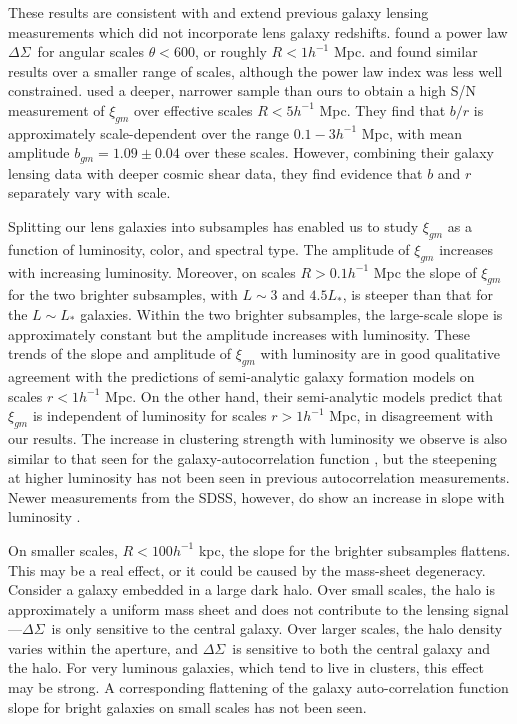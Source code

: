 \documentclass{emulateapj}
\newcommand{\deltasig}{$\Delta \Sigma$}
\begin{document}
These results are consistent with and extend previous galaxy 
lensing measurements which did not incorporate lens galaxy redshifts. 
\citet{fis00} found a power law \deltasig\ for angular
scales $\theta < 600$\arcsec, or roughly $R < 1 h^{-1}$ Mpc. 
\citet{Wilson01} and \citet{Hoekstra03a} found similar
results over a smaller range of scales, although the power law index was less
well constrained.  \citet{Hoekstra02b} used a deeper, narrower 
sample than ours to obtain a high S/N measurement of $\xi_{gm}$ over effective 
scales $R< 5 h^{-1}$ Mpc. 
They find that $b/r$ is approximately scale-dependent over 
the range $0.1-3 h^{-1}$ Mpc, with mean amplitude 
$b_{gm} = 1.09 \pm 0.04$ over these
scales. However, combining their galaxy lensing data with deeper 
cosmic shear data, they find evidence that $b$ and $r$ separately 
vary with scale.

Splitting our lens galaxies into subsamples has enabled us to 
study $\xi_{gm}$ as a function of luminosity, color, and spectral type. 
The amplitude of $\xi_{gm}$ increases 
with increasing luminosity. Moreover, on scales $R> 0.1 h^{-1}$ Mpc 
the slope of $\xi_{gm}$ for 
the two brighter subsamples, with $L \sim 3$ and $4.5 L_*$, is 
steeper than that for the $L \sim L_*$ galaxies. 
Within the 
two brighter subsamples, the large-scale slope is approximately constant but 
the amplitude increases with luminosity.
These trends of the slope and amplitude of $\xi_{gm}$ with 
luminosity are in good 
qualitative agreement with the predictions of semi-analytic 
galaxy formation models \citep{Guzik01} on scales $r < 1 h^{-1}$ Mpc. 
On the other hand, their semi-analytic models predict that $\xi_{gm}$ 
is independent of luminosity for scales $r > 1 h^{-1}$ Mpc, 
in disagreement with our results.  
The increase in clustering strength with luminosity we observe 
is also similar to that seen for the
galaxy-autocorrelation function \citep{Norberg01,Zehavi02}, but the steepening
at higher luminosity 
has not been seen in previous autocorrelation measurements. 
Newer measurements from the SDSS,
however, do show an increase in slope with luminosity \citet{Zehavi04}.

On smaller scales, $R< 100 h^{-1}$ kpc, 
the slope for the brighter subsamples flattens. This may be 
a real effect, or it could be caused by the mass-sheet degeneracy.
Consider a galaxy embedded in a large dark halo.
Over small scales, the halo 
is approximately a uniform mass sheet and does not contribute to the 
lensing signal---\deltasig\
is only sensitive to the central galaxy.  Over larger scales, the 
halo density
varies within the aperture, and \deltasig\ is sensitive to
both the central galaxy and the halo.  For very luminous
galaxies, which tend to live in clusters, this effect may be strong.
A corresponding 
flattening of the galaxy auto-correlation function slope 
for bright galaxies on small scales has not been seen.
\end{document}
